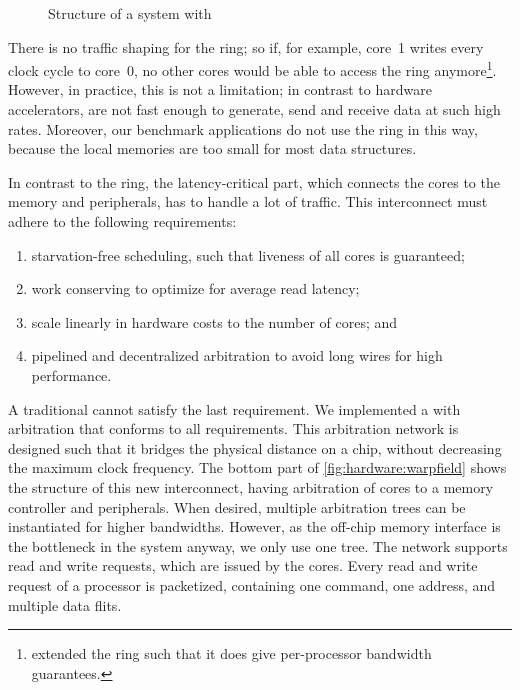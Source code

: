 \begin{figure}%
%
\caption{Structure of a system with \Warpfield*}%
\label{fig:hardware:warpfield}%
\end{figure}

There is no traffic shaping for the ring; so if, for example, core~1 writes every clock cycle to core~0, no other cores would be able to access the ring anymore\footnote{%
	\citet{dekens:ring} extended the ring such that it does give per-processor bandwidth guarantees.}.
However, in practice, this is not a limitation; in contrast to hardware accelerators, \MicroBlazes are not fast enough to generate, send and receive data at such high rates.
Moreover, our benchmark applications do not use the ring in this way, because the local memories are too small for most data structures.

In contrast to the ring, the latency-critical part, which connects the cores to the memory and peripherals, has to handle a lot of traffic.
This interconnect must adhere to the following requirements:
\begin{enumerate}
\item starvation-free scheduling, such that liveness of all cores is guaranteed;
\item work conserving to optimize for average read latency;
\item scale linearly in hardware costs to the number of cores; and
\item pipelined and decentralized arbitration to avoid long wires for high performance.
\end{enumerate}

A traditional  cannot satisfy the last requirement.
We implemented a  with  arbitration that conforms to all requirements.
This arbitration network is designed such that it bridges the physical distance on a chip, without decreasing the maximum clock frequency.
The bottom part of \vref{fig:hardware:warpfield} shows the structure of this new interconnect, having arbitration of \SYMcorecount* cores to a memory controller and peripherals.
When desired, multiple arbitration trees can be instantiated for higher bandwidths.
However, as the off-chip memory interface is the bottleneck in the system anyway, we only use one tree.
The network supports read and write requests, which are issued by the cores.
Every read and write request of a processor is packetized, containing one command, one address, and multiple data \acp{flit}.

